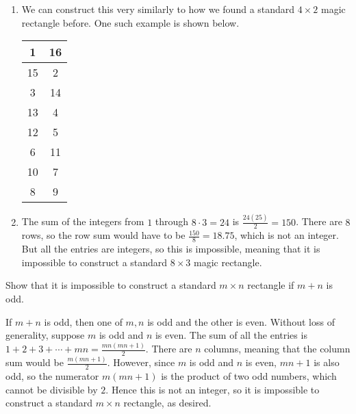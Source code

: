 \documentclass[11pt]{article}
\renewenvironment{problem}{\begin{problems}}{\end{problems}\vspace{5pt}}
\begin{document}
\begin{solution}
\begin{enumerate}[label=(\alph*)]
\item We can construct this very similarly to how we found a standard $4 \times 2$ magic rectangle before.
One such example is shown below.
\begin{center}
\begin{tabular}{|c|c|}
\hline
1 & 16 \\ \hline
15 & 2 \\ \hline
3 & 14 \\ \hline
13 & 4 \\ \hline
12 & 5 \\ \hline
6 & 11 \\ \hline
10 & 7 \\ \hline
8 & 9 \\ \hline
\end{tabular}
\end{center}

\item The sum of the integers from $1$ through $8 \cdot 3 = 24$ is $\frac{24(25)}{2} = 150$. There are $8$
rows, so the row sum would have to be $\frac{150}{8} = 18.75$, which is not an integer. But all the entries
are integers, so this is impossible, meaning that it is impossible to construct a standard $8 \times 3$ magic
rectangle.
\end{enumerate}
\end{solution}


\begin{problem}[5 points]
Show that it is impossible to construct a standard $m \times n$ rectangle if $m+n$ is odd.
\end{problem}

\begin{solution}
If $m+n$ is odd, then one of $m, n$ is odd and the other is even. Without loss of generality, suppose
$m$ is odd and $n$ is even. The sum of all the entries is $1 + 2 + 3 + \cdots + mn = \frac{mn(mn+1)}{2}$.
There are $n$ columns, meaning that the column sum would be $\frac{m(mn+1)}{2}$. However, since $m$ is odd
and $n$ is even, $mn + 1$ is also odd, so the numerator $m(mn+1)$ is the product of two odd numbers, which
cannot be divisible by $2$. Hence this is not an integer, so it is impossible to construct a standard
$m \times n$ rectangle, as desired.
\end{solution}
\end{document}
